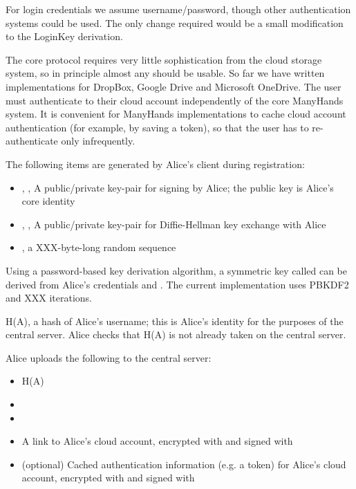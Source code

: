 \documentclass[pldi-cameraready,10pt]{sigplanconf-pldi16}
\begin{document}
For login credentials we assume username/password, though other authentication systems could be used.
The only change required would be a small modification to the LoginKey derivation.

The core protocol requires very little sophistication from the cloud storage system, so in principle almost any should be usable.
So far we have written implementations for DropBox, Google Drive and Microsoft OneDrive.
The user must authenticate to their cloud account independently of the core ManyHands system.
It is convenient for ManyHands implementations to cache cloud account authentication (for example, by saving a token), so that the user has to re-authenticate only infrequently.

The following items are generated by Alice's client during registration:

\begin{itemize}
\item {}, , A public/private key-pair for signing by Alice; the public key is Alice's core identity
\item {}, , A public/private key-pair for Diffie-Hellman key exchange with Alice
\item {}, a XXX-byte-long random sequence
\end{itemize}

Using a password-based key derivation algorithm, a symmetric key called  can be derived from Alice's credentials and .
The current implementation uses PBKDF2 and XXX iterations.

H(A), a hash of Alice's username; this is Alice's identity for the purposes of the central server.
Alice checks that H(A) is not already taken on the central server.

Alice uploads the following to the central server:

\begin{itemize}
\item H(A)
\item {}
\item {}
\item A link to Alice's cloud account, encrypted with  and signed with 
\item (optional) Cached authentication information (e.g. a token) for Alice's cloud account, encrypted with  and signed with 
\end{itemize}
\end{document}
